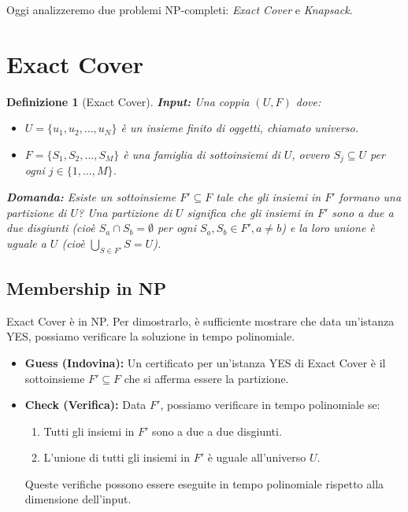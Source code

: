 \documentclass[a4paper, 11pt]{book} %
\newtheorem{definition}[theorem]{Definizione}
\theoremstyle{definition}
\begin{document}
Oggi analizzeremo due problemi NP-completi: \emph{Exact Cover} e \emph{Knapsack}.

\section{Exact Cover}

\begin{definition}[Exact Cover]
\textbf{Input:}
Una coppia $(U, F)$ dove:
\begin{itemize}
    \item $U = \{u_1, u_2, \ldots, u_N\}$ è un insieme finito di oggetti, chiamato \emph{universo}.
    \item $F = \{S_1, S_2, \ldots, S_M\}$ è una famiglia di sottoinsiemi di $U$, ovvero $S_j \subseteq U$ per ogni $j \in \{1, \ldots, M\}$.
\end{itemize}
\textbf{Domanda:} Esiste un sottoinsieme $F' \subseteq F$ tale che gli insiemi in $F'$ formano una \emph{partizione} di $U$?
Una partizione di $U$ significa che gli insiemi in $F'$ sono a due a due disgiunti (cioè $S_a \cap S_b = \emptyset$ per ogni $S_a, S_b \in F', a \neq b$) e la loro unione è uguale a $U$ (cioè $\bigcup_{S \in F'} S = U$).
\end{definition}

\subsection{Membership in NP}
Exact Cover è in NP. Per dimostrarlo, è sufficiente mostrare che data un'istanza YES, possiamo verificare la soluzione in tempo polinomiale.
\begin{itemize}
    \item \textbf{Guess (Indovina):} Un certificato per un'istanza YES di Exact Cover è il sottoinsieme $F' \subseteq F$ che si afferma essere la partizione.
    \item \textbf{Check (Verifica):} Data $F'$, possiamo verificare in tempo polinomiale se:
        \begin{enumerate}
            \item Tutti gli insiemi in $F'$ sono a due a due disgiunti.
            \item L'unione di tutti gli insiemi in $F'$ è uguale all'universo $U$.
        \end{enumerate}
    Queste verifiche possono essere eseguite in tempo polinomiale rispetto alla dimensione dell'input.
\end{itemize}
\end{document}
